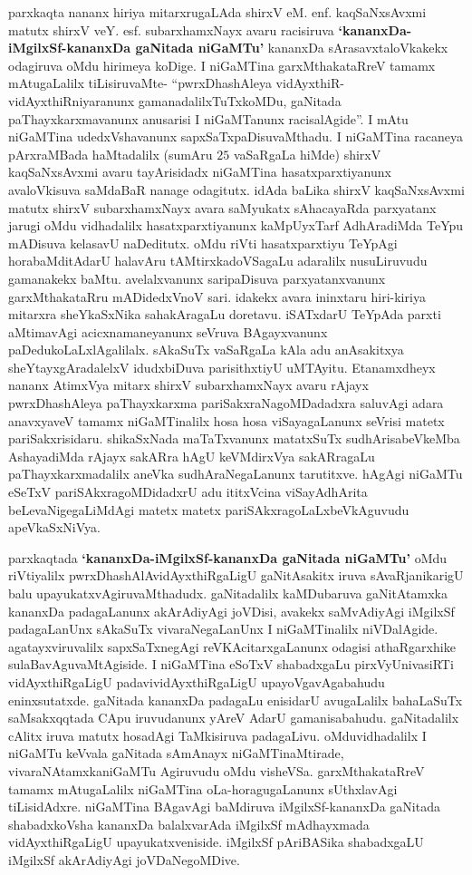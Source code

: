 parxkaqta nananx hiriya mitarxrugaLAda shirxV eM. enf. kaqSaNxsAvxmi matutx shirxV veY. esf. subarxhamxNayx avaru racisiruva {\bf `kananxDa-iMgilxSf-kananxDa gaNitada niGaMTu'} kananxDa sArasavxtaloVkakekx odagiruva oMdu hirimeya koDige. I niGaMTina garxMthakataRreV tamamx mAtugaLalilx tiLisiruvaMte- ``pwrxDhashAleya vidAyxthiR-vidAyxthiRniyaranunx gamanadalilxTuTxkoMDu, gaNitada paThayxkarxmavanunx anusarisi I niGaMTanunx racisalAgide''. I mAtu niGaMTina udedxVshavanunx sapxSaTxpaDisuvaMthadu. I niGaMTina racaneya pArxraMBada haMtadalilx (sumAru $25$ vaSaRgaLa hiMde) shirxV kaqSaNxsAvxmi avaru tayArisidadx niGaMTina hasatxparxtiyanunx avaloVkisuva saMdaBaR nanage odagitutx. idAda baLika shirxV kaqSaNxsAvxmi matutx shirxV subarxhamxNayx avara saMyukatx sAhacayaRda parxyatanx jarugi oMdu vidhadalilx hasatxparxtiyanunx kaMpUyxTarf AdhAradiMda TeYpu mADisuva kelasavU naDeditutx. oMdu riVti hasatxparxtiyu TeYpAgi horabaMditAdarU halavAru tAMtirxkadoVSagaLu adaralilx nusuLiruvudu gamanakekx baMtu. avelalxvanunx saripaDisuva parxyatanxvanunx garxMthakataRru mADidedxVnoV sari. idakekx avara ininxtaru hiri-kiriya mitarxra sheYkaSxNika sahakAragaLu doretavu. iSATxdarU TeYpAda parxti aMtimavAgi acicxnamaneyanunx seVruva BAgayxvanunx paDedukoLaLxlAgalilalx. sAkaSuTx vaSaRgaLa kAla adu anAsakitxya sheYtayxgAradalelxV idudxbiDuva parisithxtiyU uMTAyitu. Etanamxdheyx nananx AtimxVya mitarx shirxV subarxhamxNayx avaru rAjayx pwrxDhashAleya paThayxkarxma pariSakxraNagoMDadadxra saluvAgi adara anavxyaveV tamamx niGaMTinalilx hosa hosa viSayagaLanunx seVrisi matetx pariSakxrisidaru. shikaSxNada maTaTxvanunx matatxSuTx sudhArisabeVkeMba AshayadiMda rAjayx sakARra hAgU keVMdirxVya sakARragaLu paThayxkarxmadalilx aneVka sudhAraNegaLanunx tarutitxve. hAgAgi niGaMTu eSeTxV pariSAkxragoMDidadxrU adu ititxVcina viSayAdhArita beLevaNigegaLiMdAgi matetx matetx pariSAkxragoLaLxbeVkAguvudu apeVkaSxNiVya.

parxkaqtada {\bf `kananxDa-iMgilxSf-kananxDa gaNitada niGaMTu'} oMdu riVtiyalilx pwrxDhashAlA\-vidAyxthiRgaLigU gaNitAsakitx iruva sAvaRjanikarigU balu upayukatxvAgiru\-vaMthadudx. gaNitadalilx kaMDubaruva gaNitAtamxka kananxDa padagaLanunx akArAdiyAgi joVDisi, avakekx saMvAdiyAgi iMgilxSf padagaLanUnx sAkaSuTx vivaraNegaLanUnx I niGaMTinalilx niVDa\-lAgide. agatayxviruvalilx sapxSaTxnegAgi reVKAcitarxgaLanunx odagisi athaRgarxhike sulaBa\-vAgu\break\-vaMtAgiside. I niGaMTina eSoTxV shabadxgaLu pirxVyUnivasiRTi vidAyxthiRgaLigU \hbox{padavi}\break vidAyxthiRgaLigU upayoVgavAgabahudu eninxsutatxde. gaNitada kananxDa padagaLu enisi\-darU avugaLalilx bahaLaSuTx saMsakxqqtada CApu iruvudanunx yAreV AdarU gamanisa\-bahudu. gaNitadalilx cAlitx iruva matutx hosadAgi TaMkisiruva padagaLivu. oMdu\break vidhadalilx I niGaMTu keVvala gaNitada sAmAnayx niGaMTinaMtirade, vivaraNAtamxka\break niGaMTu Agiruvudu oMdu visheVSa. garxMthakataRreV tamamx mAtugaLalilx niGaMTina oLa-horagu\-gaLanunx sUthxlavAgi tiLisidAdxre. niGaMTina BAgavAgi baMdiruva iMgilxSf-\-kananxDa gaNitada shabadxkoVsha kananxDa balalxvarAda iMgilxSf mAdhayxmada vidAyxthiRgaLigU upayukatxveniside. iMgilxSf pAriBASika shabadxgaLU iMgilxSf akArAdiyAgi joVDaNe\-goMDive.

